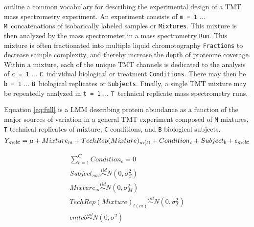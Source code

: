 \documentclass[11pt]{elife}\usepackage[]{graphicx}\usepackage[]{color}
\begin{document}
\cite{Huang2020} outline a common vocabulary for describing the experimental
design of a TMT mass spectrometry experiment. An experiment consists of
\texttt{m = 1} ... \texttt{M}\ concatenations of isobarically labeled samples or
\texttt{Mixtures}.  This mixture is then analyzed by the mass spectrometer in a
mass spectrometry \texttt{Run}.  This mixture is often fractionated into
multiple liquid chromotography \texttt{Fractions} to decrease sample complexity,
and thereby increase the depth of proteome coverage.  Within a mixture, each of
the unique TMT channels is dedicated to the analysis of \texttt{c = 1} ...
\texttt{C}\ individual biological or treatment \texttt{Conditions}.  There may
then be \texttt{b = 1} ... \texttt{B}\ biological replicates or
\texttt{Subjects}. Finally, a single TMT mixture may be repeatedly analyzed in
\texttt{t = 1} ... \texttt{T}\ technical replicate mass spectrometry runs.

Equation \ref{eq:full} is a LMM describing protein abundance as a function of
the major sources of variation  in a general TMT experiment composed of
\texttt{M} mixtures, \texttt{T} technical replicates of mixture, \texttt{C}
conditions, and \texttt{B} biological subjects.
\begin{equation} %
  \label{eq:full} 
	Y_{mcbt} = \mu + Mixture_m + TechRep(Mixture)_{m(t)} + Condition_c + 
	Subject_b + \epsilon_{mcbt}\\
\end{equation}

\begin{equation}
  \begin{gathered}
    \label{eq:constraints}
	\sum_{c=1}^{C} Condition_c = 0 \\
	Subject_{mcb} \stackrel{iid}{\sim} N(0,\sigma^2_S) \\
	Mixture_m \stackrel{iid}{\sim} N(0,\sigma^2_M) \\
	TechRep(Mixture)_{t(m)} \stackrel{iid}{\sim} N(0,\sigma^2_T) \\
	\epsilon{mtcb} \stackrel{iid}{\sim} N(0,\sigma^2) \\
  \end{gathered}
\end{equation}
\end{document}
